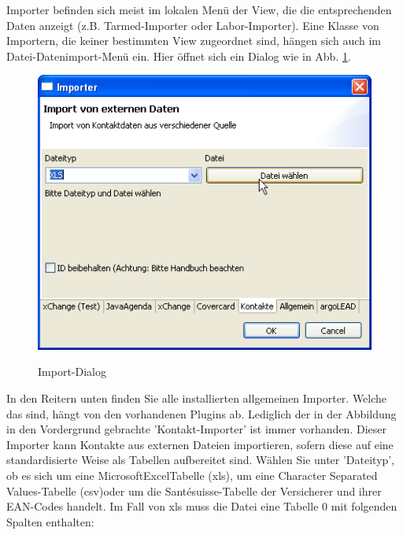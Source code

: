Importer befinden sich meist im lokalen Menü der View, die die entsprechenden Daten anzeigt (z.B. Tarmed-Importer oder Labor-Importer). Eine Klasse von Importern, die keiner bestimmten View zugeordnet sind, hängen sich auch im Datei-Datenimport-Menü ein. Hier öffnet sich ein Dialog wie in Abb. \ref{fig:importdlg}.
\begin{figure}
  \includegraphics{images/importdlg}\\
  \caption{Import-Dialog}\label{fig:importdlg}
\end{figure}
In den Reitern unten finden Sie alle installierten allgemeinen Importer. Welche das sind, hängt von den vorhandenen Plugins ab. Lediglich der in der Abbildung in den Vordergrund gebrachte 'Kontakt-Importer' ist immer vorhanden. Dieser Importer kann Kontakte aus externen Dateien importieren, sofern diese auf eine standardisierte Weise als Tabellen aufbereitet sind. Wählen Sie unter 'Dateityp', ob es sich um eine Microsoft\texttrademark Excel\texttrademark Tabelle (xls), um eine Character Separated Values-Tabelle (csv)oder um die Santésuisse-Tabelle der Versicherer und ihrer EAN-Codes handelt.
Im Fall von xls muss die Datei eine Tabelle 0 mit folgenden Spalten enthalten:
